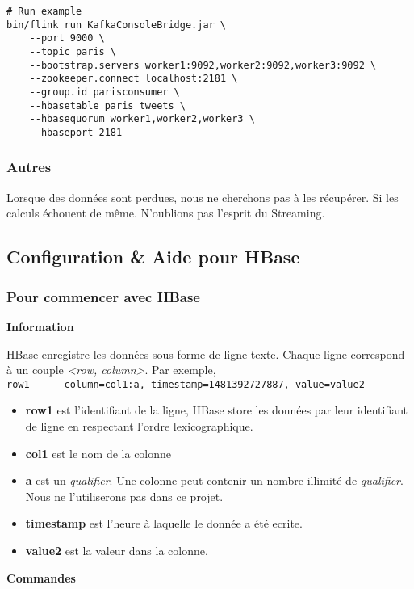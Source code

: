 \documentclass[a4paper,oneside,12pt]{article}
\begin{document}
\begin{verbatim}
# Run example
bin/flink run KafkaConsoleBridge.jar \
	--port 9000 \
	--topic paris \
	--bootstrap.servers worker1:9092,worker2:9092,worker3:9092 \
	--zookeeper.connect localhost:2181 \
	--group.id parisconsumer \
	--hbasetable paris_tweets \
	--hbasequorum worker1,worker2,worker3 \
	--hbaseport 2181
\end{verbatim}

\subsubsection{Autres}

Lorsque des données sont perdues, nous ne cherchons pas à les récupérer. Si les calculs échouent de même. N'oublions pas l'esprit du Streaming. 

\pagebreak
\subsection{Configuration \& Aide pour HBase}


\subsubsection{Pour commencer avec HBase}

\textbf{Information}

HBase enregistre les données sous forme de ligne texte. Chaque ligne correspond à un couple \textit{<row, column>}. 
Par exemple, \\
\verb!row1      column=col1:a, timestamp=1481392727887, value=value2!

\begin{itemize}
\item \textbf{row1} est l'identifiant de la ligne, HBase store les données par leur identifiant de ligne en respectant l'ordre lexicographique. 
\item \textbf{col1} est le nom de la colonne
\item \textbf{a} est un \textit{qualifier}. Une colonne peut contenir un nombre illimité de \textit{qualifier}. Nous ne l'utiliserons pas dans ce projet. 
\item \textbf{timestamp} est l'heure à laquelle le donnée a été ecrite. 
\item \textbf{value2} est la valeur dans la colonne. 
\end{itemize}

\textbf{Commandes}
\end{document}
